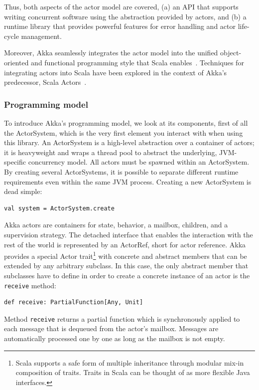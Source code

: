 \documentclass{sig-alternate}
\begin{document}
Thus, both aspects of the actor model are covered, (a) an API that supports writing concurrent software using the abstraction provided by actors, and (b) a runtime library that provides powerful features for error handling and actor life-cycle management.

Moreover, Akka seamlessly integrates the actor model into the unified object-oriented and functional programming style that Scala enables~\cite{OderskyR14}. Techniques for integrating actors into Scala have been explored in the context of Akka's predecessor, Scala Actors~\cite{HallerO09}.

\subsubsection{Programming model}

To introduce Akka's programming model, we look at its components, first of all the ActorSystem, which is the very first element you interact with when using this library.
An ActorSystem is a high-level abstraction over a container of actors; it is heavyweight and wraps a thread pool to abstract the underlying, JVM-specific concurrency model.
All actors must be spawned within an ActorSystem. By creating several ActorSystems, it is possible to separate different runtime requirements even within the same JVM process.
Creating a new ActorSystem is dead simple:
\begin{lstlisting}
val system = ActorSystem.create
\end{lstlisting}
\noindent
Akka actors are containers for state, behavior, a mailbox, children, and a supervision strategy. The detached interface that enables the interaction with the rest of the world is represented by an ActorRef, short for actor reference.
Akka provides a special Actor trait\footnote{Scala supports a safe form of multiple inheritance through modular mix-in composition of traits. Traits in Scala can be thought of as more flexible Java interfaces.} with concrete and abstract members that can be extended by any arbitrary subclass.
In this case, the only abstract member that subclasses have to define in order to create a concrete instance of an actor is the \verb|receive| method:
\begin{lstlisting}
def receive: PartialFunction[Any, Unit]
\end{lstlisting}
\noindent
Method \verb|receive| returns a partial function which is synchronously applied to each message that is dequeued from the actor's mailbox. Messages are automatically processed one by one as long as the mailbox is not empty.
\end{document}
